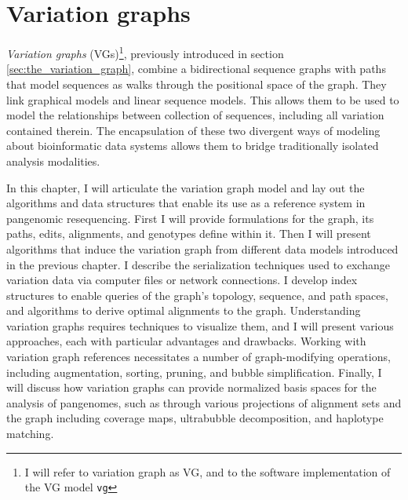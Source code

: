 
\chapter{Variation graphs}

\ifpdf
    \graphicspath{{Chapter2/Figs/Raster/}{Chapter2/Figs/PDF/}{Chapter2/Figs/}}
\else
    \graphicspath{{Chapter2/Figs/Vector/}{Chapter2/Figs/}}
\fi

\emph{Variation graphs} (VGs)\footnote{I will refer to variation graph as VG, and to the software implementation of the VG model {\tt vg}}, previously introduced in section \ref{sec:the_variation_graph}, combine a bidirectional sequence graphs with paths that model sequences as walks through the positional space of the graph.
They link graphical models and linear sequence models.
This allows them to be used to model the relationships between collection of sequences, including all variation contained therein.
The encapsulation of these two divergent ways of modeling about bioinformatic data systems allows them to bridge traditionally isolated analysis modalities.

In this chapter, I will articulate the variation graph model and lay out the algorithms and data structures that enable its use as a reference system in pangenomic resequencing.
First I will provide formulations for the graph, its paths, edits, alignments, and genotypes define within it.
Then I will present algorithms that induce the variation graph from different data models introduced in the previous chapter.
I describe the serialization techniques used to exchange variation data via computer files or network connections.
I develop index structures to enable queries of the graph's topology, sequence, and path spaces, and algorithms to derive optimal alignments to the graph.
Understanding variation graphs requires techniques to visualize them, and I will present various approaches, each with particular advantages and drawbacks.
Working with variation graph references necessitates a number of graph-modifying operations, including augmentation, sorting, pruning, and bubble simplification.
Finally, I will discuss how variation graphs can provide normalized basis spaces for the analysis of pangenomes, such as through various projections of alignment sets and the graph including coverage maps, ultrabubble decomposition, and haplotype matching.

